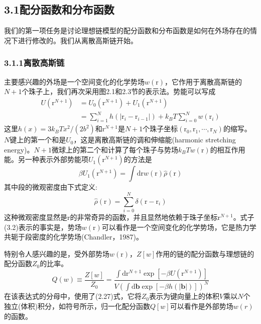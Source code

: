 \subsection{3.1配分函数和分布函数}
我们的第一项任务是讨论理想链模型的配分函数和分布函数是如何在外场存在的情况下进行修改的。我们从离散高斯链开始。
\subsubsection{3.1.1离散高斯链}
主要感兴趣的外场是一个空间变化的化学势场$w(\mathrm{r})$，它作用于离散高斯链的$N+1$个珠子上，我们再次采用图2.1和2.3节的表示法。势能可以写成
\begin{equation}
\begin{aligned}
U(\mathrm{r}^{N+1})&=U_0(\mathrm{r}^{N+1})+U_1(\mathrm{r}^{N+1})\\
&=\sum\limits_{i=1}^Nh(\left|\mathrm{r}_i-\mathrm{r}_{i-1}\right|)+k_BT\sum\limits_{i=0}^Nw(\mathrm{r}_i)
\end{aligned}
\end{equation}
这里$h(x)=3k_BTx^2/(2b^2)$和$\mathrm{r}^{N+1}$是$N+1$个珠子坐标$(\mathrm{r}_0,\mathrm{r}_1,\cdots,\mathrm{r}_N)$的缩写。$N$键上的第一个和是$U_0$，这是离散高斯链的调和伸缩能(harmonic stretching energy)。$N+1$微球上的第二个和计算了每个珠子与势场$k_BTw(\mathrm{r})$的相互作用能。另一种表示外部势能项$U_1(\mathrm{r}^{N+1})$的方法是
\begin{equation}
\beta U_1(\mathrm{r}^{N+1})=\int\mathrm{d}\mathrm{r}w(\mathrm{r})\hat{\rho}(\mathrm{r})
\end{equation}
其中段的微观密度由下式定义:
\begin{equation}
\hat{\rho}(\mathrm{r})=\sum\limits_{i=0}^N\delta(\mathrm{r}-\mathrm{r}_i)
\end{equation}
这种微观密度显然是$\mathrm{r}$的非常奇异的函数，并且显然地依赖于珠子坐标$\mathrm{r}^{N+1}$。式子(3.2)表示的事实是，势场$w(\mathrm{r})$可以看作是一个空间变化的化学势场，它是热力学共轭于段密度的化学势场(Chandler，1987)。

特别令人感兴趣的是，受外部势场$w(\mathrm{r})$，$Z[w]$作用的链的配分函数与理想链的配分函数$Z_0$的比率。
\begin{equation}
Q(w)\equiv\frac{Z[w]}{Z_0}=\frac{\int\mathrm{d}\mathrm{r}^{N+1}\exp[-\beta U(\mathrm{r}^{N+1})]}{V(\int\mathrm{d}\mathbf{b}\exp[-\beta h(\left|\mathbf{b}\right|)])^N}
\end{equation}
在该表达式的分母中，使用了(2.27)式，它将$Z_0$表示为键向量上的体积$V$乘以$N$个独立(体积)积分，如符号所示，归一化配分函数$Q[w]$可以看作是外部势场$w(r)$的函数。

